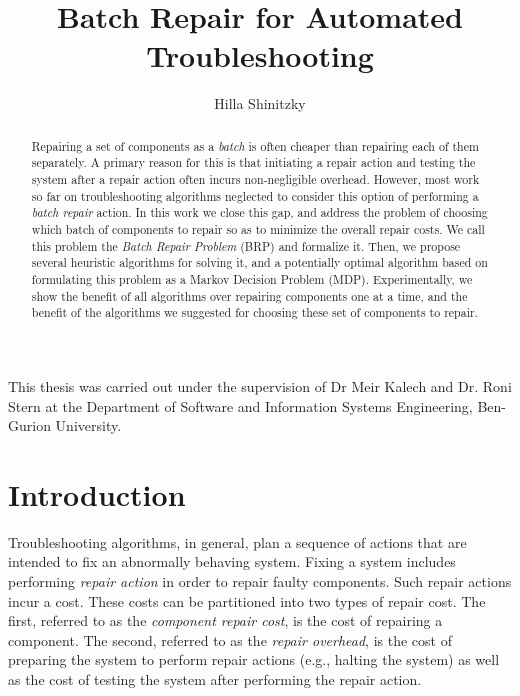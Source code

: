 \documentclass[a4paper,11pt]{report}
\begin{document}
\title{\Huge{Batch Repair for Automated Troubleshooting}}
\author{Hilla Shinitzky}

\maketitle

\begin{center}
This thesis was carried out under the supervision of Dr Meir Kalech and Dr.
Roni Stern at the Department of Software and Information Systems Engineering, Ben-Gurion
University.

\end{center}


\newpage

\tableofcontents \listoffigures \listoftables

\newpage

\begin{abstract}
Repairing a set of components as a \emph{batch} is often cheaper than repairing each of them separately. 
A primary reason for this is that initiating a repair action and testing the system after a repair action often incurs non-negligible overhead. 
However, most work so far on troubleshooting algorithms neglected to consider 
this option of performing a \emph{batch repair} action. 
In this work we close this gap, and address the problem of choosing which batch of components to repair so as to minimize the overall repair costs. We call this problem the \emph{Batch Repair Problem} (BRP) and formalize it. Then, we propose several heuristic algorithms for solving it, and a potentially optimal algorithm based on formulating this problem as a Markov Decision Problem (MDP). 
Experimentally, we show the benefit of all algorithms over repairing components one at a time, and the benefit of the algorithms we suggested for choosing these set of components to repair.
\end{abstract}


\chapter{Introduction}
\label{sec:introduction}
Troubleshooting algorithms, in general, plan a sequence of actions that are intended to fix an abnormally behaving system. Fixing a system includes performing \emph{repair action} in order to repair faulty components. Such repair actions incur a cost. These costs can be partitioned into two types of repair cost. The first, referred to as the {\em component repair cost}, is the cost of repairing a component. The second, referred to as the {\em repair overhead}, is the cost of preparing the system to perform repair actions (e.g., halting the system) as well as the cost of testing the system after performing the repair action.
\end{document}

